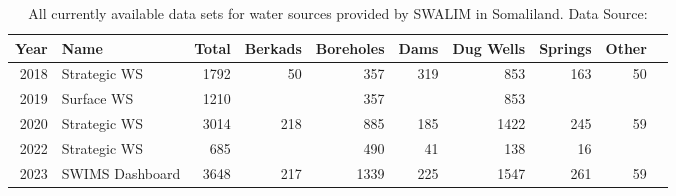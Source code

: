 \begin{sidewaystable}
    \caption{All currently available data sets for water sources provided by SWALIM in Somaliland. Data Source: \autocite{swalimSomaliaWaterSources,swalmSomaliaWaterSources2023}}
    \begin{adjustbox}{center,max width=\linewidth}
        \def\arraystretch{1.5}
        \begin{tabular}{rlrrrrrrrr}
            \toprule
            \bf Year & \bf Name    & \bf Total & \bf Berkads & \bf Boreholes & \bf Dams & \bf Dug Wells & \bf Springs & Other \\
            \midrule
            2018 & Strategic WS    & 1792      & 50           & 357          & 319      & 853           & 163         & 50    \\
            2019 & Surface WS      & 1210      & ~            & 357          & ~        & 853           & ~           & ~     \\
            2020 & Strategic WS    & 3014      & 218          & 885          & 185      & 1422          & 245         & 59    \\
            2022 & Strategic WS    & 685       & ~            & 490          & 41       & 138           & 16          & ~     \\
            2023 & SWIMS Dashboard & 3648      & 217          & 1339         & 225      & 1547          & 261         & 59    \\
            \bottomrule
        \end{tabular}
    \end{adjustbox}
    \label{tab:ress_da}
\end{sidewaystable}





